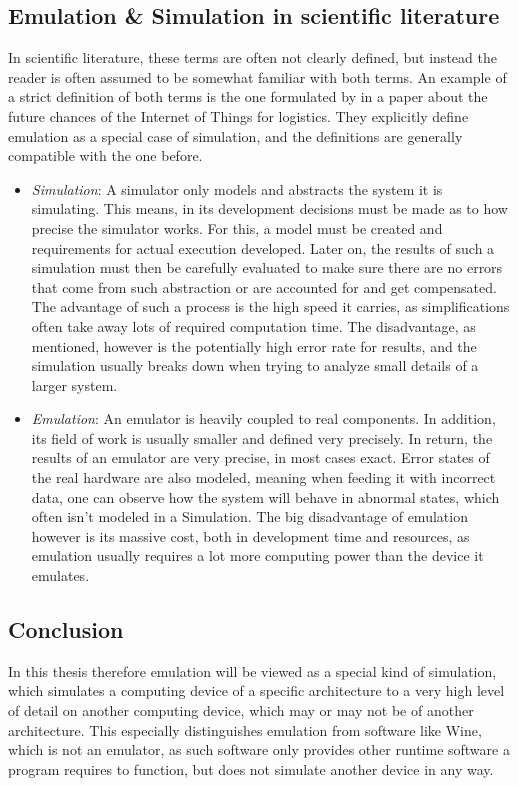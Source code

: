 \subsection{Emulation \& Simulation in scientific literature}
In scientific literature, these terms are often not clearly defined, but instead the reader is often assumed to be somewhat familiar with both terms.
An example of a strict definition of both terms is the one formulated by 
in a paper about the future chances of the Internet of Things for logistics\cite{definition_iot}.
They explicitly define emulation as a special case of simulation,
and the definitions are generally compatible with the one before.
\begin{itemize}
    \item \emph{Simulation}: A simulator only models and abstracts the system it is simulating.
    This means, in its development decisions must be made as to how precise the simulator works.
    For this, a model must be created and requirements for actual execution developed.
    Later on, the results of such a simulation must then be carefully evaluated to make sure
    there are no errors that come from such abstraction
    or are accounted for and get compensated.
    The advantage of such a process is the high speed it carries,
    as simplifications often take away lots of required computation time.
    The disadvantage, as mentioned, however is the potentially high error rate for results,
    and the simulation usually breaks down when trying to analyze small details of a larger system\cite{definition_iot}.
    \item \emph{Emulation}: An emulator is heavily coupled to real components.
    In addition, its field of work is usually smaller and defined very precisely.
    In return, the results of an emulator are very precise, in most cases exact.
    Error states of the real hardware are also modeled, meaning when feeding it with incorrect data,
    one can observe how the system will behave in abnormal states, which often isn't modeled in a Simulation.
    The big disadvantage of emulation however is its massive cost,
    both in development time and resources,
    as emulation usually requires a lot more computing power than the device it emulates\cite{definition_iot}.
\end{itemize}

\subsection{Conclusion}\label{sec:conclusion_emulation}
In this thesis therefore emulation will be viewed as a special kind of simulation,
which simulates a computing device of a specific architecture to a very high level of detail
on another computing device, which may or may not be of another architecture.
This especially distinguishes emulation from software like Wine, which is not an emulator,
as such software only provides other runtime software a program requires to function, but does not simulate another device in any way\cite{wine}.

